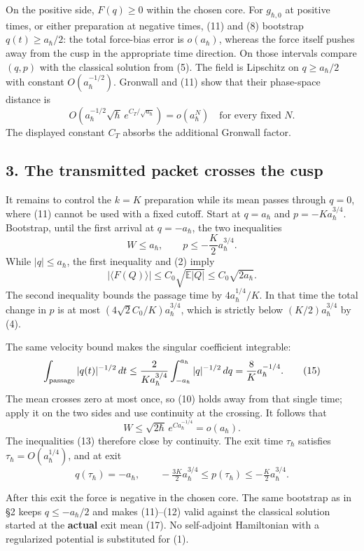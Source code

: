 \documentclass[11pt,a4paper]{article}
\begin{document}
On the positive side, \(F(q)\ge0\) within the chosen core. For
\(g_{\hbar,0}\) at positive times, or either preparation at negative
times, (11) and (8) bootstrap \(q(t)\ge a_\hbar/2\): the total
force-bias error is \(o(a_\hbar)\), whereas the force itself pushes away
from the cusp in the appropriate time direction. On those intervals
compare \((q,p)\) with the classical solution from (5). The field is
Lipschitz on \(q\ge a_\hbar/2\) with constant \(O(a_\hbar^{-1/2})\).
Gronwall and (11) show that their phase-space distance is
\[O\!\left(a_\hbar^{-1/2}\sqrt\hbar\,
              e^{C_T/\sqrt{a_\hbar}}\right)=o(a_\hbar^N)
 \quad\text{for every fixed }N.\tag{12}\] The displayed constant \(C_T\)
absorbs the additional Gronwall factor.

\subsection{3. The transmitted packet crosses the
cusp}\label{the-transmitted-packet-crosses-the-cusp}

It remains to control the \(k=K\) preparation while its mean passes
through \(q=0\), where (11) cannot be used with a fixed cutoff. Start at
\(q=a_\hbar\) and \(p=-Ka_\hbar^{3/4}\). Bootstrap, until the first
arrival at \(q=-a_\hbar\), the two inequalities
\[W\le a_\hbar,\qquad p\le-\frac K2a_\hbar^{3/4}.\tag{13}\] While
\(|q|\le a_\hbar\), the first inequality and (2) imply \[
 |\langle F(Q)\rangle|\le C_0\sqrt{\mathbb E|Q|}
 \le C_0\sqrt{2a_\hbar}.\tag{14}
\] The second inequality bounds the passage time by
\(4a_\hbar^{1/4}/K\). In that time the total change in \(p\) is at most
\((4\sqrt2 C_0/K)a_\hbar^{3/4}\), which is strictly below
\((K/2)a_\hbar^{3/4}\) by (4).

The same velocity bound makes the singular coefficient integrable: \[
 \int_{\rm passage}|q(t)|^{-1/2}\,dt
 \le \frac{2}{K a_\hbar^{3/4}}
        \int_{-a_\hbar}^{a_\hbar}|q|^{-1/2}\,dq
 =\frac8K a_\hbar^{-1/4}.\tag{15}
\] The mean crosses zero at most once, so (10) holds away from that
single time; apply it on the two sides and use continuity at the
crossing. It follows that
\[W\le\sqrt{2\hbar}\,e^{C a_\hbar^{-1/4}}=o(a_\hbar).\tag{16}\] The
inequalities (13) therefore close by continuity. The exit time
\(\tau_\hbar\) satisfies \(\tau_\hbar=O(a_\hbar^{1/4})\), and at exit
\[q(\tau_\hbar)=-a_\hbar,\qquad
 -\tfrac{3K}{2}a_\hbar^{3/4}
 \le p(\tau_\hbar)\le-\tfrac K2a_\hbar^{3/4}.\tag{17}\]

After this exit the force is negative in the chosen core. The same
bootstrap as in §2 keeps \(q\le-a_\hbar/2\) and makes (11)--(12) valid
against the classical solution started at the \textbf{actual} exit mean
(17). No self-adjoint Hamiltonian with a regularized potential is
substituted for (1).
\end{document}
